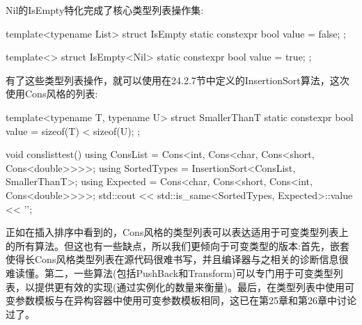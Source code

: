 Nil的IsEmpty特化完成了核心类型列表操作集:

\begin{cpp}
template<typename List>
struct IsEmpty {
	static constexpr bool value = false;
};

template<>
struct IsEmpty<Nil> {
	static constexpr bool value = true;
};
\end{cpp}

有了这些类型列表操作，就可以使用在24.2.7节中定义的InsertionSort算法，这次使用Cons风格的列表:

\begin{cpp}
template<typename T, typename U>
struct SmallerThanT {
	static constexpr bool value = sizeof(T) < sizeof(U);
};

void conslisttest()
{
	using ConsList = Cons<int, Cons<char, Cons<short, Cons<double>>>>;
	using SortedTypes = InsertionSort<ConsList, SmallerThanT>;
	using Expected = Cons<char, Cons<short, Cons<int, Cons<double>>>>;
	std::cout << std::is_same<SortedTypes, Expected>::value << ’\n’;
}
\end{cpp}

正如在插入排序中看到的，Cons风格的类型列表可以表达适用于可变类型列表上的所有算法。但这也有一些缺点，所以我们更倾向于可变类型的版本:首先，嵌套使得长Cons风格类型列表在源代码很难书写，并且编译器与之相关的诊断信息很难读懂。第二，一些算法(包括PushBack和Transform)可以专门用于可变类型列表，以提供更有效的实现(通过实例化的数量来衡量)。最后，在类型列表中使用可变参数模板与在异构容器中使用可变参数模板相同，这已在第25章和第26章中讨论过了。





















